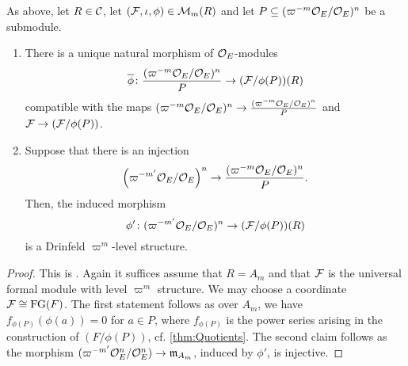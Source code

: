 \documentclass[../main.tex]{subfiles}
\begin{document}
\begin{lem}\label{lem:DrinfeldLevelOnQuotients}
  As above, let $R \in \mathcal{C}$, let $(\mathcal{F}, \iota, \phi) \in \mathcal{M}_m(R)$ and let 
  $P \subseteq (\varpi^{-m}\mathcal{O}_E/\mathcal{O}_E)^n$ be a submodule.   
  \begin{enumerate}
    \item There is a unique natural morphism of $\mathcal{O}_E$-modules
      \begin{equation*}
        \overline \phi \colon \frac{(\varpi^{-m} \mathcal{O}_E/\mathcal{O}_E)^n}{P} \to (\mathcal{F}/\phi(P))(R)
      \end{equation*}
      compatible with the maps $(\varpi^{-m}\mathcal{O}_E/\mathcal{O}_E)^n \to
      \frac{(\varpi^{-m} \mathcal{O}_E/\mathcal{O}_E)^n}{P}$ and $\mathcal{F} \to (\mathcal{F}/\phi(P))$. 
    \item Suppose that  there is an injection 
  \begin{equation*}
    \left(\varpi^{-m'} \mathcal{O}_E/\mathcal{O}_E \right)^n \to \frac{(\varpi^{-m}
    \mathcal{O}_E/\mathcal{O}_E)^n}{P}.
  \end{equation*}
  Then, the induced morphism 
  \begin{equation*}
  \phi'\colon ({\varpi^{-m'} \mathcal{O}_E}/{\mathcal{O}_E})^n  \to 
  (\mathcal{F}/\phi(P))(R)
  \end{equation*}
  is a Drinfeld $\varpi^m$-level structure.
  \end{enumerate}
\end{lem}
\begin{proof}
  This is \cite[Proposition 4.4]{drinfel1974elliptic}. Again it suffices assume 
  that $R = A_m$ and that $\mathcal{F}$ is the universal formal module with level
  $\varpi^m$ structure. We may choose a coordinate $\mathcal{F} \cong \textnormal{FG}(F)$. The first
  statement follows as over $A_m$, we have $f_{\phi(P)}(\phi(a)) = 0$ for $a
  \in P$, where $f_{\phi(P)}$ is the power series arising in the construction of 
  $(F/\phi(P))$, cf. \cref{thm:Quotients}. The second claim follows as the 
  morphism $(\varpi^{-m'} \mathcal{O}_E^n/\mathcal{O}_E^n) \to \mathfrak{m}_{A_m}$, induced by 
  $\phi'$, is injective.
\end{proof}
\end{document}
